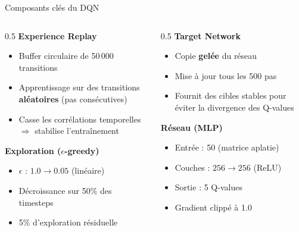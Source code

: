 \documentclass[10pt]{beamer}
\begin{document}
\begin{frame}{Composants cl\'es du DQN}
    \begin{columns}
        \begin{column}{0.5\textwidth}
            \textbf{Experience Replay}
            \begin{itemize}
                \item Buffer circulaire de 50\,000 transitions
                \item Apprentissage sur des transitions \textbf{al\'eatoires} (pas cons\'ecutives)
                \item Casse les corr\'elations temporelles $\Rightarrow$ stabilise l'entra\^inement
            \end{itemize}

            \vspace{0.3cm}
            \textbf{Exploration ($\epsilon$-greedy)}
            \begin{itemize}
                \item $\epsilon$ : $1.0 \to 0.05$ (lin\'eaire)
                \item D\'ecroissance sur 50\% des timesteps
                \item 5\% d'exploration r\'esiduelle
            \end{itemize}
        \end{column}
        \begin{column}{0.5\textwidth}
            \textbf{Target Network}
            \begin{itemize}
                \item Copie \textbf{gel\'ee} du r\'eseau
                \item Mise \`a jour tous les 500 pas
                \item Fournit des cibles stables pour \'eviter la divergence des Q-values
            \end{itemize}

            \vspace{0.3cm}
            \textbf{R\'eseau (MLP)}
            \begin{itemize}
                \item Entr\'ee : 50 (matrice aplatie)
                \item Couches : $256 \to 256$ (ReLU)
                \item Sortie : 5 Q-values
                \item Gradient clipp\'e \`a 1.0
            \end{itemize}
        \end{column}
    \end{columns}
\end{frame}
\end{document}
